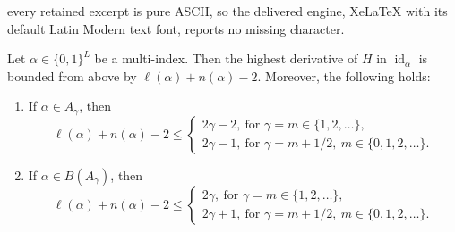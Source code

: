 \documentclass[10pt,a4paper]{amsart}
\newcommand{\id}{\operatorname{id}}
\begin{document}
every retained excerpt is pure ASCII, so the delivered engine, XeLaTeX with its default Latin Modern text font, reports no missing character.
\begin{lemma}\label{lem:highDerLemma}
Let $\alpha \in \{ 0,1 \}^{L}$ be a multi-index. Then the highest derivative of $H$ in $\id_{\alpha}$ is bounded from above by $\ell(\alpha) + n(\alpha) - 2$. Moreover, the following holds:
\begin{enumerate}
\item If $\alpha \in A_{\gamma}$, then
\begin{equation*}
\ell(\alpha) + n(\alpha) - 2 \leq \begin{cases} 2 \gamma - 2,\ \text{for } \gamma = m \in \{1,2,\ldots \},\\ 2 \gamma - 1,\ \text{for } \gamma = m + 1/2,\ m \in \{0,1,2,\ldots \}. \end{cases}
\end{equation*}
\item If $\alpha \in B(A_{\gamma})$, then 
\begin{equation*}
\ell(\alpha) + n(\alpha) - 2 \leq \begin{cases} 2 \gamma,\ \text{for } \gamma = m \in \{1,2,\ldots \},\\ 2 \gamma + 1,\ \text{for } \gamma = m + 1/2,\ m \in \{0,1,2,\ldots \}. \end{cases}
\end{equation*}
\end{enumerate}
\end{lemma}
\end{document}
